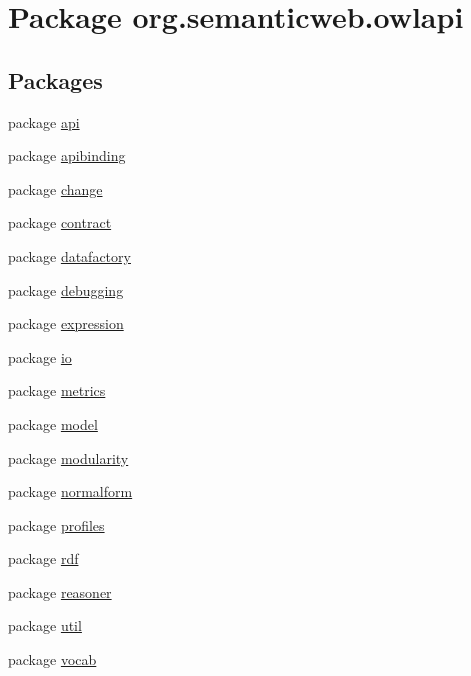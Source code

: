 \hypertarget{namespaceorg_1_1semanticweb_1_1owlapi}{\section{Package org.\-semanticweb.\-owlapi}
\label{namespaceorg_1_1semanticweb_1_1owlapi}
}
\subsection*{Packages}
\begin{DoxyCompactItemize}
\item 
package \hyperlink{namespaceorg_1_1semanticweb_1_1owlapi_1_1api}{api}
\item 
package \hyperlink{namespaceorg_1_1semanticweb_1_1owlapi_1_1apibinding}{apibinding}
\item 
package \hyperlink{namespaceorg_1_1semanticweb_1_1owlapi_1_1change}{change}
\item 
package \hyperlink{namespaceorg_1_1semanticweb_1_1owlapi_1_1contract}{contract}
\item 
package \hyperlink{namespaceorg_1_1semanticweb_1_1owlapi_1_1datafactory}{datafactory}
\item 
package \hyperlink{namespaceorg_1_1semanticweb_1_1owlapi_1_1debugging}{debugging}
\item 
package \hyperlink{namespaceorg_1_1semanticweb_1_1owlapi_1_1expression}{expression}
\item 
package \hyperlink{namespaceorg_1_1semanticweb_1_1owlapi_1_1io}{io}
\item 
package \hyperlink{namespaceorg_1_1semanticweb_1_1owlapi_1_1metrics}{metrics}
\item 
package \hyperlink{namespaceorg_1_1semanticweb_1_1owlapi_1_1model}{model}
\item 
package \hyperlink{namespaceorg_1_1semanticweb_1_1owlapi_1_1modularity}{modularity}
\item 
package \hyperlink{namespaceorg_1_1semanticweb_1_1owlapi_1_1normalform}{normalform}
\item 
package \hyperlink{namespaceorg_1_1semanticweb_1_1owlapi_1_1profiles}{profiles}
\item 
package \hyperlink{namespaceorg_1_1semanticweb_1_1owlapi_1_1rdf}{rdf}
\item 
package \hyperlink{namespaceorg_1_1semanticweb_1_1owlapi_1_1reasoner}{reasoner}
\item 
package \hyperlink{namespaceorg_1_1semanticweb_1_1owlapi_1_1util}{util}
\item 
package \hyperlink{namespaceorg_1_1semanticweb_1_1owlapi_1_1vocab}{vocab}
\end{DoxyCompactItemize}
